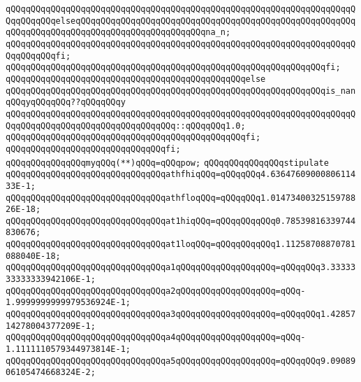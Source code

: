 \verb|qQQqqQQqqQQqqQQqqQQqqQQqqQQqqQQqqQQqqQQqqQQqqQQqqQQqqQQqqQQqqQQqqQQqqQQqqQQqqQQqelseqQQqqQQqqQQqqQQqqQQqqQQqqQQqqQQqqQQqqQQqqQQqqQQqqQQqqQQqqQQqqQQqqQQqqQQqqQQqqQQqqQQqqQQqqQQqqQQqna_n;|\newline
\verb|qQQqqQQqqQQqqQQqqQQqqQQqqQQqqQQqqQQqqQQqqQQqqQQqqQQqqQQqqQQqqQQqqQQqqQQqqQQqqQQqfi;|\newline
\verb|qQQqqQQqqQQqqQQqqQQqqQQqqQQqqQQqqQQqqQQqqQQqqQQqqQQqqQQqqQQqqQQqfi;|\newline
\verb|qQQqqQQqqQQqqQQqqQQqqQQqqQQqqQQqqQQqqQQqqQQqqQQqelse|\newline
\verb|qQQqqQQqqQQqqQQqqQQqqQQqqQQqqQQqqQQqqQQqqQQqqQQqqQQqqQQqqQQqqQQqis_nanqQQqyqQQqqQQq??qQQqqQQqy|\newline
\verb|qQQqqQQqqQQqqQQqqQQqqQQqqQQqqQQqqQQqqQQqqQQqqQQqqQQqqQQqqQQqqQQqqQQqqQQqqQQqqQQqqQQqqQQqqQQqqQQqqQQqqQQq::qQQqqQQq1.0;|\newline
\verb|qQQqqQQqqQQqqQQqqQQqqQQqqQQqqQQqqQQqqQQqqQQqqQQqfi;|\newline
\verb|qQQqqQQqqQQqqQQqqQQqqQQqqQQqqQQqfi;|\newline
\newline
\verb|qQQqqQQqqQQqqQQqmyqQQq(**)qQQq=qQQqpow;|\newline
\newline
\verb|qQQqqQQqqQQqqQQqstipulate|\newline
\newline
\verb|qQQqqQQqqQQqqQQqqQQqqQQqqQQqqQQqathfhiqQQq=qQQqqQQq4.6364760900080611433E-1;|\newline
\verb|qQQqqQQqqQQqqQQqqQQqqQQqqQQqqQQqathfloqQQq=qQQqqQQq1.0147340032515978826E-18;|\newline
\verb|qQQqqQQqqQQqqQQqqQQqqQQqqQQqqQQqat1hiqQQq=qQQqqQQqqQQq0.78539816339744830676;|\newline
\verb|qQQqqQQqqQQqqQQqqQQqqQQqqQQqqQQqat1loqQQq=qQQqqQQqqQQq1.11258708870781088040E-18;|\newline
\verb|qQQqqQQqqQQqqQQqqQQqqQQqqQQqqQQqa1qQQqqQQqqQQqqQQqqQQq=qQQqqQQq3.3333333333333942106E-1;|\newline
\verb|qQQqqQQqqQQqqQQqqQQqqQQqqQQqqQQqa2qQQqqQQqqQQqqQQqqQQq=qQQq-1.9999999999979536924E-1;|\newline
\verb|qQQqqQQqqQQqqQQqqQQqqQQqqQQqqQQqa3qQQqqQQqqQQqqQQqqQQq=qQQqqQQq1.4285714278004377209E-1;|\newline
\verb|qQQqqQQqqQQqqQQqqQQqqQQqqQQqqQQqa4qQQqqQQqqQQqqQQqqQQq=qQQq-1.1111110579344973814E-1;|\newline
\verb|qQQqqQQqqQQqqQQqqQQqqQQqqQQqqQQqa5qQQqqQQqqQQqqQQqqQQq=qQQqqQQq9.0908906105474668324E-2;|\newline
